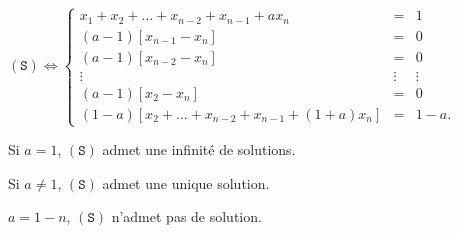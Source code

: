 \begin{multi}
    \item* \((\mathtt{S})\Leftrightarrow
\left\{\begin{array}{rcc}
x_1+x_2+\dots+ x_{n-2}+x_{n-1}+ax_n \qquad  \qquad  &=&1\\
(a-1)[x_{n-1}-x_n]\qquad \qquad&=&0\\
(a-1)[x_{n-2}-x_n]\qquad \qquad&=&0\\
\vdots \qquad \qquad&\vdots&\vdots\\
(a-1)[x_2-x_n]\qquad \qquad&=&0\\
(1-a)[x_2+\dots+x_{n-2}+x_{n-1}+(1+a)x_n]&=&1-a.\end{array}\right.\)
    \item* Si \(a=1\), \((\mathtt{S})\) admet une infinité de solutions.
    \item Si \(a \neq 1\), \((\mathtt{S})\) admet une unique solution.
    \item* \(a=1-n\), \((\mathtt{S})\) n'admet pas de solution.
\end{multi}


